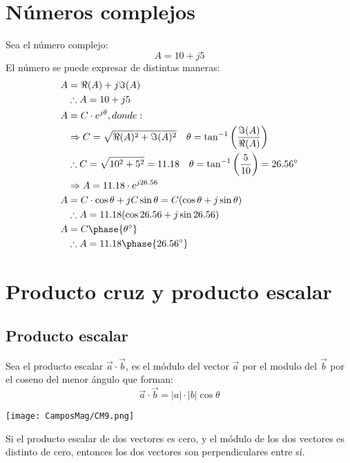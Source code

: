 \documentclass[
	11pt, %
	fleqn, %
	a4paper, %
]{LegrandOrangeBook}
\begin{document}
\section{Números complejos}
Sea el número complejo:
\begin{equation}
\label{art:numeroscomplejos}
A=10 + j5
\end{equation}
El número se puede expresar de distintas maneras:
\begin{align*}
A&=\Re(A) + j\Im(A)\\
&\therefore A=10 + j5\\
A&=C\cdot e^{j\theta}, donde:\\
&\Rightarrow C=\sqrt{\Re(A)^2 + \Im(A)^2}\hspace{10pt}\theta=\tan^{-1}\left(\frac{\Im(A)}{\Re(A)}\right)\\
&\therefore C=\sqrt{10^2+5^2}=11.18\hspace{10pt}\theta=\tan^{-1}\left(\frac{5}{10}\right)=26.56^{\circ}\\
&\Rightarrow A=11.18\cdot e^{j 26.56}\\
A&=C\cdot\cos\theta+jC\sin\theta=C(\cos\theta+j\sin\theta)\\
&\therefore A=11.18(\cos 26.56+j\sin 26.56)\\
A&=C\phase{\theta^{\circ}}\\
&\therefore A=11.18\phase{26.56^{\circ}}
\end{align*}
\section{Producto cruz y producto escalar}
\subsection{Producto escalar}
Sea el producto escalar $\vec{a}\cdot\vec{b}$, es el módulo del vector $\vec{a}$ por el modulo del $\vec{b}$ por el coseno del menor ángulo que forman:
\begin{equation}
\vec{a}\cdot\vec{b}=|a|\cdot |b|\cos\theta
\end{equation}
\begin{center}
\texttt{[image: CamposMag/CM9.png]}
\end{center}
Si el producto escalar de dos vectores es cero, y el módulo de los dos vectores es distinto de cero, entonces los dos vectores son perpendiculares entre sí.
\end{document}
